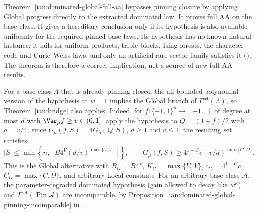 \begin{remark}
\label{ian:dominated-global-versus-theorem-a}
Theorem~\ref{ian:dominated-global-full-aa} bypasses pinning closure
by applying Global progress directly to the extracted dominated
law. It proves full AA on the base class. It gives a hereditary
conclusion only if its hypothesis is also available uniformly for
the required pinned base laws. Its hypothesis has no known natural
instance: it fails for uniform products, triple blocks, Ising forests,
the character code and Curie--Weiss laws, and only an artificial
rare-sector family satisfies it
(). The theorem is therefore a
correct implication, not a source of new full-AA results.

For a base class \(\Lambda\) that is already pinning-closed, the
all-bounded-polynomial version of the hypothesis at \(w=1\) implies the
Global branch of \(\Gamma^{\mathrm{set}}(\Lambda)\), so
Theorem~\ref{ian:bridge} also applies. Indeed, for
\(f:\{-1,1\}^n\to[-1,1]\) of degree at most \(d\) with
\(\Var_\mu f\ge v\in(0,1]\), apply the hypothesis to \(Q=(1+f)/2\) with
\(a=v/4\); since \(G_\mu(f,S)=4G_\mu(Q,S)\), \(d\ge1\) and \(v\le1\), the
resulting set satisfies
\[
 |S|\le\min\left\{n,\left\lceil B4^V(d/v)^{\max\{U,V\}}\right\rceil\right\},
 \qquad
 G_\mu(f,S)\ge4^{1-C}c\,(v/d)^{\max\{C,D\}}.
\]
This is the Global alternative with \(B_G=B4^V\), \(K_G=\max\{U,V\}\),
\(c_G=4^{1-C}c\), \(C_G=\max\{C,D\}\), and arbitrary Local constants.
For an arbitrary base class \(\mathcal A\), the parameter-degraded
dominated hypothesis (gain allowed to decay like \(w^\kappa\)) and
\(\Gamma^{\mathrm{set}}(\operatorname{Pin}\mathcal A)\) are incomparable,
by Proposition~\ref{ian:dominated-global-pinning-incomparable} in
.
\end{remark}
